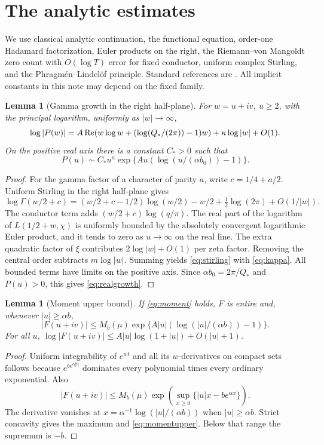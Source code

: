 \documentclass[11pt]{article}
\newtheorem{lemma}[theorem]{Lemma}
\theoremstyle{definition}\newtheorem{definition}[theorem]{Definition}
\theoremstyle{remark}\newtheorem{remark}[theorem]{Remark}
\begin{document}
\section{The analytic estimates}
We use classical analytic continuation, the functional equation, order-one Hadamard factorization, Euler products on the right, the Riemann--von Mangoldt zero count with $O(\log T)$ error for fixed conductor, uniform complex Stirling, and the Phragm\'en--Lindel\"of principle. Standard references are \cite{davenport,titch,zeros,boas,hormander}. All implicit constants in this note may depend on the fixed family.

\begin{lemma}[Gamma growth in the right half-plane]\label{lem:stirling}
For $w=u+iv$, $u\ge2$, with the principal logarithm, uniformly as $|w|\to\infty$,
\begin{equation}\label{eq:stirling}
 \log |P(w)|=A\operatorname{Re}\!\left(w\log w+(\log(Q_*/(2\pi))-1)w\right)+\kappa\log|w|+O(1).
\end{equation}
On the positive real axis there is a constant $C_*>0$ such that
\begin{equation}\label{eq:realgrowth}
 P(u)\sim C_* u^\kappa\exp\{A u(\log(u/(\alpha b_0))-1)\}.
\end{equation}
\end{lemma}
\begin{proof}
For the gamma factor of a character of parity $a$, write $c=1/4+a/2$. Uniform Stirling in the right half-plane gives
\[
 \log\Gamma(w/2+c)=(w/2+c-1/2)\log(w/2)-w/2+\tfrac12\log(2\pi)+O(1/|w|).
\]
The conductor term adds $(w/2+c)\log(q/\pi)$. The real part of the logarithm of $L(1/2+w,\chi)$ is uniformly bounded by the absolutely convergent logarithmic Euler product, and it tends to zero as $u\to\infty$ on the real line. The extra quadratic factor of $\xi$ contributes $2\log|w|+O(1)$ per zeta factor. Removing the central order subtracts $m\log|w|$. Summing yields \eqref{eq:stirling} with \eqref{eq:kappa}. All bounded terms have limits on the positive axis. Since $\alpha b_0=2\pi/Q_*$ and $P(u)>0$, this gives \eqref{eq:realgrowth}.
\end{proof}

\begin{lemma}[Moment upper bound]\label{lem:moment}
If \eqref{eq:moment} holds, $F$ is entire and, whenever $|u|\ge\alpha b$,
\begin{equation}\label{eq:momentupper}
 |F(u+iv)|\le M_b(\mu)\exp\{A |u|(\log(|u|/(\alpha b))-1)\}.
\end{equation}
For all $u$, $\log|F(u+iv)|\le A|u|\log(1+|u|)+O(|u|+1)$.
\end{lemma}
\begin{proof}
Uniform integrability of $e^{wt}$ and all its $w$-derivatives on compact sets follows because $e^{b e^{\alpha|t|}}$ dominates every polynomial times every ordinary exponential. Also
\[
 |F(u+iv)|\le M_b(\mu)\exp\left(\sup_{x\ge0}\{|u|x-be^{\alpha x}\}\right).
\]
The derivative vanishes at $x=\alpha^{-1}\log(|u|/(\alpha b))$ when $|u|\ge\alpha b$. Strict concavity gives the maximum and \eqref{eq:momentupper}. Below that range the supremum is $-b$.
\end{proof}
\end{document}
